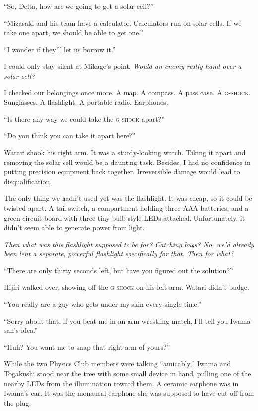 \documentclass[
    a4paper,
    12pt,
    twoside,
    openany,
    UTF8,
    fontset=windows
]{ctexbook}
\begin{document}
``So, Delta, how are we going to get a solar cell?''

``Mizasaki and his team have a calculator. Calculators run on solar cells. If we take one apart, we should be able to get one.''

``I wonder if they'll let us borrow it.''

I could only stay silent at Mikage's point. \textit{Would an enemy really hand over a solar cell?}

I checked our belongings once more. A map. A compass. A pass case. A \textsc{g-shock}. Sunglasses. A flashlight. A portable radio. Earphones.

``Is there any way we could take the \textsc{g-shock} apart?''

``Do you think you can take it apart here?''

Watari shook his right arm. It was a sturdy-looking watch. Taking it apart and removing the solar cell would be a daunting task. Besides, I had no confidence in putting precision equipment back together. Irreversible damage would lead to disqualification.

The only thing we hadn't used yet was the flashlight. It was cheap, so it could be twisted apart. A tail switch, a compartment holding three AAA batteries, and a green circuit board with three tiny bulb-style LEDs attached. Unfortunately, it didn't seem able to generate power from light.

\textit{Then what was this flashlight supposed to be for? Catching bugs? No, we'd already been lent a separate, powerful flashlight specifically for that. Then for what?}

``There are only thirty seconds left, but have you figured out the solution?''

Hijiri walked over, showing off the \textsc{g-shock} on his left arm. Watari didn't budge.

``You really are a guy who gets under my skin every single time.''

``Sorry about that. If you beat me in an arm-wrestling match, I'll tell you Iwama-san's idea.''

``Huh? You want me to snap that right arm of yours?''

While the two Physics Club members were talking ``amicably,'' Iwama and Togakushi stood near the tree with some small device in hand, pulling one of the nearby LEDs from the illumination toward them. A ceramic earphone was in Iwama's ear. It was the monaural earphone she was supposed to have cut off from the plug.
\end{document}
